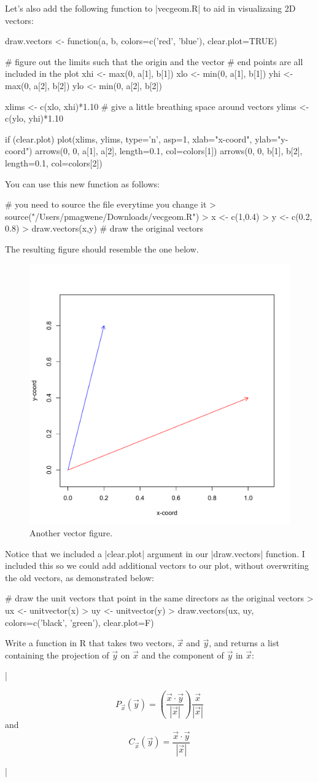 Let's also add the following function to |vecgeom.R| to aid in visualizaing 2D vectors:
%
\begin{R}
draw.vectors <- function(a, b, colors=c('red', 'blue'), clear.plot=TRUE){

    # figure out the limits such that the origin and the vector
    # end points are all included in the plot
    xhi <- max(0, a[1], b[1])
    xlo <- min(0, a[1], b[1])
    yhi <- max(0, a[2], b[2])
    ylo <- min(0, a[2], b[2])

    xlims <- c(xlo, xhi)*1.10 # give a little breathing space around vectors
    ylims <- c(ylo, yhi)*1.10

    if (clear.plot){
        plot(xlims, ylims, type='n', asp=1, xlab="x-coord", ylab="y-coord")
    }
    arrows(0, 0, a[1], a[2], length=0.1, col=colors[1])
    arrows(0, 0, b[1], b[2], length=0.1, col=colors[2])
}
\end{R}
%
You can use this new function as follows:
\begin{R}
# you need to source the file everytime you change it
> source("/Users/pmagwene/Downloads/vecgeom.R")
> x <- c(1,0.4)
> y <- c(0.2, 0.8)
> draw.vectors(x,y)  # draw the original vectors
\end{R}
%
The resulting figure should resemble the one below.
%
\begin{figure}[htbp]
\centering
\includegraphics[width=0.33\columnwidth]{./figures/hands-on2/vecfig2.pdf}
\caption{Another vector figure.}
\end{figure}

Notice that we included a |clear.plot| argument in our |draw.vectors| function. I included this so we could add additional vectors to our plot, without overwriting the old vectors, as demonstrated below:
\begin{R}
# draw the unit vectors that point in the same directors as the original vectors
> ux <- unitvector(x)
> uy <- unitvector(y)
> draw.vectors(ux, uy, colors=c('black', 'green'), clear.plot=F)
\end{R}

\begin{assignment}
Write a function in R that takes two vectors, $\vec{x}$ and $\vec{y}$, and returns a list containing the projection of $\vec{y}$ on $\vec{x}$ and the component of $\vec{y}$ in $\vec{x}$:

\lstDeleteShortInline|

\[P_{\vec{x}}(\vec{y}) = \left(\frac{\vec{x} \cdot \vec{y}}{|\vec{x}|}\right) \frac{\vec{x}}{|\vec{x}|}\]
and
\[C_{\vec{x}}(\vec{y}) = \frac{\vec{x} \cdot \vec{y}}{|\vec{x}|}\]

\lstMakeShortInline|

\end{assignment}

